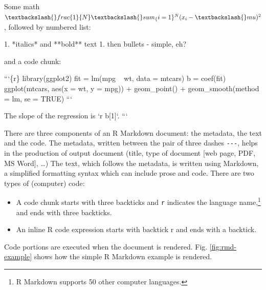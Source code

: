\documentclass[conference,final,a4paper,]{IEEEtran}
\newenvironment{Shaded}{\begin{snugshade}}{\end{snugshade}}
\newcommand{\BaseNTok}[1]{\textcolor[rgb]{0.00,0.00,0.81}{#1}}
\newcommand{\NormalTok}[1]{#1}
\newcommand{\StringTok}[1]{\textcolor[rgb]{0.31,0.60,0.02}{#1}}
\begin{document}
\begin{Shaded}
\begin{Highlighting}[]
\NormalTok{Some math }
\NormalTok{$\textbackslash{}frac\{1\}\{N\} \textbackslash{}sum_\{i=1\}^N (x_i -\textbackslash{}mu)^2$,}
\NormalTok{followed by numbered list:}
  
\NormalTok{1. }\StringTok{*italics* and **bold** text}
\StringTok{1. then bullets}
\StringTok{    - simple, eh?}

\NormalTok{and a code chunk:}

\BaseNTok{```\{r\}}
\BaseNTok{library(ggplot2)}
\BaseNTok{fit = lm(mpg ~ wt, data = mtcars)}
\BaseNTok{b   = coef(fit)}
\BaseNTok{ggplot(mtcars, aes(x = wt, y = mpg)) +}
\BaseNTok{  geom_point() + }
\BaseNTok{  geom_smooth(method = lm, se = TRUE)}
\BaseNTok{```}

\NormalTok{The slope of the regression is }\BaseNTok{`r b[1]`}\NormalTok{.}
\BaseNTok{```}
\end{Highlighting}
\end{Shaded}

\normalsize

There are three components of an R Markdown document: the metadata, the text and the code.
The metadata, written between the pair of three dashes \texttt{-\/-\/-}, helps in the production of
output document (title, type of document {[}web page, PDF, MS Word{]}, \ldots)
The text, which follows the metadata, is written using Markdown, a simplified formatting syntax
which can include prose and code.
There are two types of (computer) code:

\begin{itemize}
\item
  A code chunk starts with three backticks and \texttt{r} indicates the
  language name,\footnote{R Markdown supports 50 other computer languages.} and ends with
  three backticks.
\item
  An inline R code expression starts with backtick r and ends with a backtick.
\end{itemize}

Code portions are executed when the document is rendered.
Fig. \ref{fig:rmd-example} shows how the simple R Markdown example is rendered.
\end{document}
